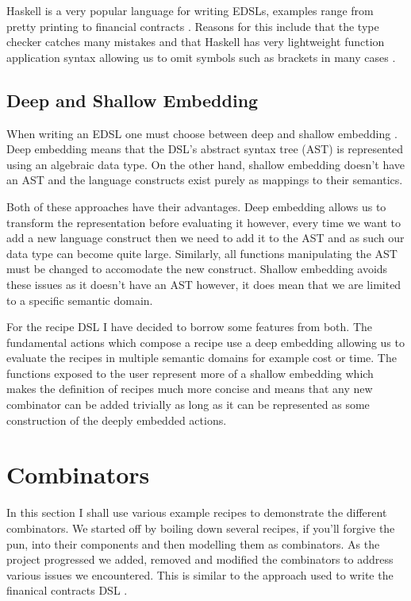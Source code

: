 \documentclass[11pt]{article}
\begin{document}
\medbreak

Haskell is a very popular language for writing EDSLs, examples
range from pretty printing \cite{pretty} to financial contracts \cite{contracts}.
Reasons for this include that the type checker catches many mistakes
and that Haskell has very lightweight function application syntax
allowing us to omit symbols such as brackets in many cases \cite{snoyman}.

\subsection{Deep and Shallow Embedding}
When writing an EDSL one must choose between deep and shallow embedding \cite{embedding}.
Deep embedding means that the DSL's abstract syntax tree (AST) is
represented using an algebraic data type. On the other hand, shallow
embedding doesn't have an AST and the language constructs exist purely
as mappings to their semantics.

\medbreak

Both of these approaches have their advantages. Deep embedding
allows us to transform the representation before evaluating
it however, every time we want to add a new language construct
then we need to add it to the AST and as such our data type
can become quite large. Similarly, all functions manipulating
the AST must be changed to accomodate the new construct. Shallow
embedding avoids these issues as it doesn't have an AST however,
it does mean that we are limited to a specific semantic domain.

\medbreak

For the recipe DSL I have decided to borrow some features from
both. The fundamental actions which compose a recipe use a
deep embedding allowing us to evaluate the recipes in multiple
semantic domains for example cost or time. The functions
exposed to the user represent more of a shallow embedding
which makes the definition of recipes much more concise and
means that any new combinator can be added trivially as long
as it can be represented as some construction of the deeply
embedded actions.

\section{Combinators}

In this section I shall use various example recipes to demonstrate
the different combinators. We started off by boiling down several
recipes, if you'll forgive the pun, into their components and
then modelling them as combinators. As the project progressed
we added, removed and modified the combinators to address
various issues we encountered. This is similar to the approach
used to write the finanical contracts DSL \cite{contracts}.
\end{document}
